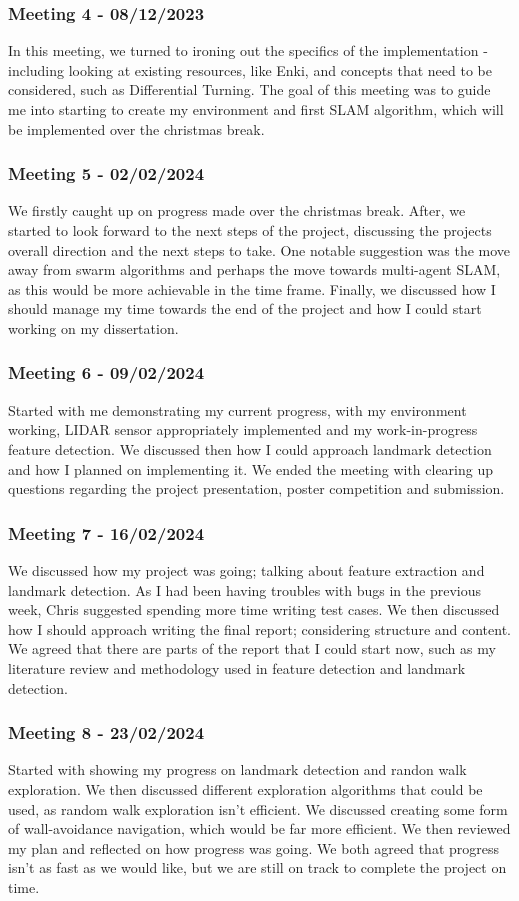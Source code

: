 \documentclass[12pt]{article}
\begin{document}
\subsubsection{Meeting 4 - 08/12/2023}
In this meeting, we turned to ironing out the specifics of the implementation - including looking at existing resources, like
Enki, and concepts that need to be considered, such as Differential Turning. The goal of this meeting was to guide me into
starting to create my environment and first SLAM algorithm, which will be implemented over the christmas break.
\subsubsection{Meeting 5 - 02/02/2024}
We firstly caught up on progress made over the christmas break. After, we started to look forward to the next steps of the project,
discussing the projects overall direction and the next steps to take. One notable suggestion was the move away from swarm algorithms
and perhaps the move towards multi-agent SLAM, as this would be more achievable in the time frame. Finally, we discussed how I
should manage my time towards the end of the project and how I could start working on my dissertation.
\subsubsection{Meeting 6 - 09/02/2024}
Started with me demonstrating my current progress, with my environment working, LIDAR sensor appropriately implemented and
my work-in-progress feature detection. We discussed then how I could approach landmark detection and how I planned on implementing
it. We ended the meeting with clearing up questions regarding the project presentation, poster competition and submission.
\subsubsection{Meeting 7 - 16/02/2024}
We discussed how my project was going; talking about feature extraction and landmark detection. As I had been having troubles
with bugs in the previous week, Chris suggested spending more time writing test cases. We then discussed how I should approach
writing the final report; considering structure and content. We agreed that there are parts of the report that I could start
now, such as my literature review and methodology used in feature detection and landmark detection.
\subsubsection{Meeting 8 - 23/02/2024}
Started with showing my progress on landmark detection and randon walk exploration. We then discussed different exploration
algorithms that could be used, as random walk exploration isn't efficient. We discussed creating some form of wall-avoidance
navigation, which would be far more efficient. We then reviewed my plan and reflected on how progress was going. We both
agreed that progress isn't as fast as we would like, but we are still on track to complete the project on time.
\end{document}
